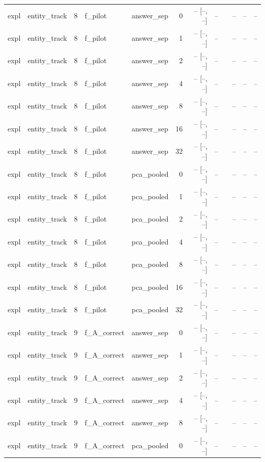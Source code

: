 \begin{tabular}{llrllrrrlrrr}
expl & entity\_track & 8 & f\_pilot & answer\_sep & 0 & -- [--, --] & -- &  & -- & -- & -- \\
expl & entity\_track & 8 & f\_pilot & answer\_sep & 1 & -- [--, --] & -- &  & -- & -- & -- \\
expl & entity\_track & 8 & f\_pilot & answer\_sep & 2 & -- [--, --] & -- &  & -- & -- & -- \\
expl & entity\_track & 8 & f\_pilot & answer\_sep & 4 & -- [--, --] & -- &  & -- & -- & -- \\
expl & entity\_track & 8 & f\_pilot & answer\_sep & 8 & -- [--, --] & -- &  & -- & -- & -- \\
expl & entity\_track & 8 & f\_pilot & answer\_sep & 16 & -- [--, --] & -- &  & -- & -- & -- \\
expl & entity\_track & 8 & f\_pilot & answer\_sep & 32 & -- [--, --] & -- &  & -- & -- & -- \\
expl & entity\_track & 8 & f\_pilot & pca\_pooled & 0 & -- [--, --] & -- &  & -- & -- & -- \\
expl & entity\_track & 8 & f\_pilot & pca\_pooled & 1 & -- [--, --] & -- &  & -- & -- & -- \\
expl & entity\_track & 8 & f\_pilot & pca\_pooled & 2 & -- [--, --] & -- &  & -- & -- & -- \\
expl & entity\_track & 8 & f\_pilot & pca\_pooled & 4 & -- [--, --] & -- &  & -- & -- & -- \\
expl & entity\_track & 8 & f\_pilot & pca\_pooled & 8 & -- [--, --] & -- &  & -- & -- & -- \\
expl & entity\_track & 8 & f\_pilot & pca\_pooled & 16 & -- [--, --] & -- &  & -- & -- & -- \\
expl & entity\_track & 8 & f\_pilot & pca\_pooled & 32 & -- [--, --] & -- &  & -- & -- & -- \\
expl & entity\_track & 9 & f\_A\_correct & answer\_sep & 0 & -- [--, --] & -- &  & -- & -- & -- \\
expl & entity\_track & 9 & f\_A\_correct & answer\_sep & 1 & -- [--, --] & -- &  & -- & -- & -- \\
expl & entity\_track & 9 & f\_A\_correct & answer\_sep & 2 & -- [--, --] & -- &  & -- & -- & -- \\
expl & entity\_track & 9 & f\_A\_correct & answer\_sep & 4 & -- [--, --] & -- &  & -- & -- & -- \\
expl & entity\_track & 9 & f\_A\_correct & answer\_sep & 8 & -- [--, --] & -- &  & -- & -- & -- \\
expl & entity\_track & 9 & f\_A\_correct & pca\_pooled & 0 & -- [--, --] & -- &  & -- & -- & -- \\

\end{tabular}
